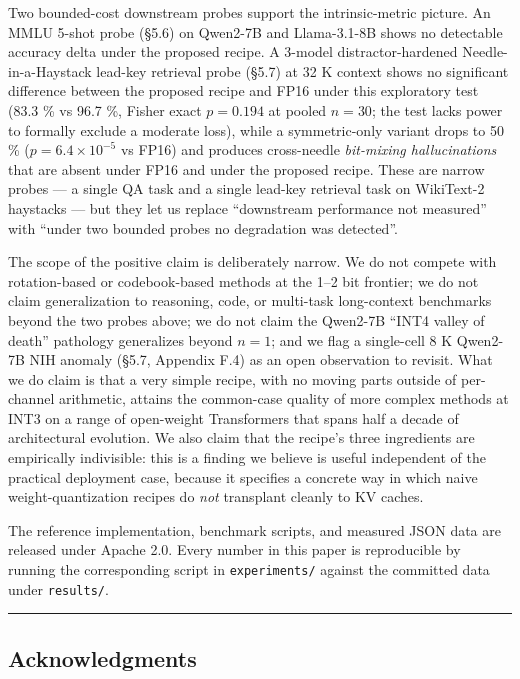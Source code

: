 \documentclass[
]{article}
\begin{document}
Two bounded-cost downstream probes support the intrinsic-metric picture.
An MMLU 5-shot probe (§5.6) on Qwen2-7B and Llama-3.1-8B shows no
detectable accuracy delta under the proposed recipe. A 3-model
distractor-hardened Needle-in-a-Haystack lead-key retrieval probe (§5.7)
at 32 K context shows no significant difference between the proposed
recipe and FP16 under this exploratory test (83.3 \% vs 96.7 \%, Fisher
exact \(p = 0.194\) at pooled \(n = 30\); the test lacks power to
formally exclude a moderate loss), while a symmetric-only variant drops
to 50 \% (\(p = 6.4 \times 10^{-5}\) vs FP16) and produces cross-needle
\emph{bit-mixing hallucinations} that are absent under FP16 and under
the proposed recipe. These are narrow probes --- a single QA task and a
single lead-key retrieval task on WikiText-2 haystacks --- but they let
us replace ``downstream performance not measured'' with ``under two
bounded probes no degradation was detected''.

The scope of the positive claim is deliberately narrow. We do not
compete with rotation-based or codebook-based methods at the 1--2 bit
frontier; we do not claim generalization to reasoning, code, or
multi-task long-context benchmarks beyond the two probes above; we do
not claim the Qwen2-7B ``INT4 valley of death'' pathology generalizes
beyond \(n = 1\); and we flag a single-cell 8 K Qwen2-7B NIH anomaly
(§5.7, Appendix F.4) as an open observation to revisit. What we do claim
is that a very simple recipe, with no moving parts outside of
per-channel arithmetic, attains the common-case quality of more complex
methods at INT3 on a range of open-weight Transformers that spans half a
decade of architectural evolution. We also claim that the recipe's three
ingredients are empirically indivisible: this is a finding we believe is
useful independent of the practical deployment case, because it
specifies a concrete way in which naive weight-quantization recipes do
\emph{not} transplant cleanly to KV caches.

The reference implementation, benchmark scripts, and measured JSON data
are released under Apache 2.0. Every number in this paper is
reproducible by running the corresponding script in
\texttt{experiments/} against the committed data under
\texttt{results/}.

\begin{center}\rule{0.5\linewidth}{0.5pt}\end{center}

\subsection{Acknowledgments}\label{acknowledgments}
\end{document}
